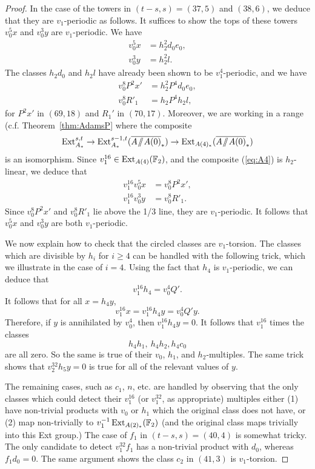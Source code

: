 \begin{proof}
In the case of the towers in $(t-s,s) = (37, 5)$ and $(38,6)$, we deduce that they are $v_1$-periodic as follows.  It suffices to show the tops of these towers $v_0^5 x$ and $v_0^3 y$ are $v_1$-periodic.
We have
\begin{align*}
v_0^5 x & = {h_2^2 d_0e_0}, \\
v_0^3 y & = h_2^2 l.
\end{align*}
The classes $h_2 d_0$ and $h_2 l$ have already been shown to be $v_1^4$-periodic, and we have
\begin{align*}
v_0^8 P^2 x' & = {h_2^2 P^4 d_0e_0}, \\
v_0^8 R'_1 & = h_2 P^4 h_2 l,
\end{align*}
for $P^2 x' $ in $(69,18)$ and $R_1'$ in $(70,17)$.
Moreover, we are working in a range (c.f. Theorem~\ref{thm:AdamsP} where the composite
\begin{equation}\label{eq:A4}
\operatorname{Ext}^{s,t}_{A_*} \rightarrow \operatorname{Ext}^{s-1,t}_{A_*}(\overline{A \! \sslash \! A(0)}_*) \rightarrow \operatorname{Ext}_{A(4)_*}(\overline{A \! \sslash \! A(0)}_*)
\end{equation}
is an isomorphism.  Since $v_1^{16} \in \operatorname{Ext}_{A(4)}(\mathbb{F}_2)$, and the composite (\ref{eq:A4}) is $h_2$-linear, we deduce that
\begin{align*}
v_1^{16} v_0^5 x & = v_0^8 P^2 x', \\
v_1^{16} v_0^3 y & = v_0^8 R'_1.
\end{align*}
Since $v_0^8 P^2 x'$ and $v_0^8 R'_1$ lie above the 1/3 line, they are $v_1$-periodic.  It follows that $v_0^5 x$ and $v_0^3 y$ are both $v_1$-periodic.

We now explain how to check that the circled classes are $v_1$-torsion. The classes which are divisible by $h_i$ for $i \ge 4$ can be handled with the following trick, which we illustrate in the case of $i = 4$.  Using the fact that $h_4$ is $v_1$-periodic, we can deduce that
$$ v_1^{16} h_4 = v_0^4 Q'. $$
It follows that for all $x = h_4 y$,
$$ v_1^{16}x = v_1^{16} h_4 y = v_0^4 Q' y. $$
Therefore, if $y$ is annihilated by $v_0^4$, then $v_1^{16} h_4 y = 0$.
It follows that $v_1^{16}$ times the classes
$$ h_4 h_1, \: h_4 h_2, h_4c_0 $$
are all zero. So the same is true of their $v_0$, $h_1$, and $h_2$-multiples.
The same trick shows that $v_2^{32} h_5 y = 0$ is true for all of the relevant values of $y$.


The remaining cases, such as $c_1$, $n$, etc. are handled by observing that the only classes which could detect their $v_1^{16}$ (or $v_1^{32}$, as appropriate) multiples either (1) have non-trivial products with $v_0$ or $h_1$ which the original class does not have, or (2) map non-trivially to $v_1^{-1}\operatorname{Ext}_{A(2)_*}(\mathbb{F}_2)$ (and the original class maps trivially into this Ext group.)  The case of $f_1$ in $(t-s,s) = (40,4)$ is somewhat tricky.  The only candidate to detect $v_1^{32}f_1$ has a non-trivial product with $d_0$, whereas $f_1d_0 = 0$.  The same argument shows the class $c_2$ in $(41,3)$ is $v_1$-torsion.
\end{proof}

